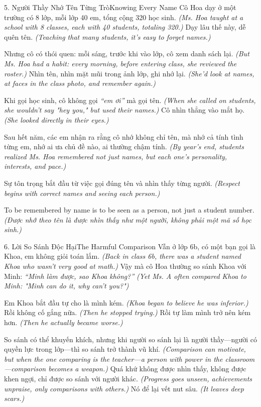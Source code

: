 \begin{truyen}{5. Người Thầy Nhớ Tên Từng Trò}{Knowing Every Name}
Cô Hoa dạy ở một trường có 8 lớp, mỗi lớp 40 em, tổng cộng 320 học sinh.
\textit{(Ms. Hoa taught at a school with 8 classes, each with 40 students, totaling 320.)}
Dạy lâu thế này, dễ quên tên.
\textit{(Teaching that many students, it's easy to forget names.)}

Nhưng cô có thói quen: mỗi sáng, trước khi vào lớp, cô xem danh sách lại.
\textit{(But Ms. Hoa had a habit: every morning, before entering class, she reviewed the roster.)}
Nhìn tên, nhìn mặt mũi trong ảnh lớp, ghi nhớ lại.
\textit{(She'd look at names, at faces in the class photo, and remember again.)}

Khi gọi học sinh, cô không gọi \textit{``em ơi''} mà gọi tên.
\textit{(When she called on students, she wouldn't say "hey you," but used their names.)}
Cô nhìn thẳng vào mắt họ.
\textit{(She looked directly in their eyes.)}

Sau hết năm, các em nhận ra rằng cô nhớ không chỉ tên, mà nhớ cả tính tình từng em, nhớ ai ưa chủ đề nào, ai thường chậm tính.
\textit{(By year's end, students realized Ms. Hoa remembered not just names, but each one's personality, interests, and pace.)}

Sự tôn trọng bắt đầu từ việc gọi đúng tên và nhìn thấy từng người.
\textit{(Respect begins with correct names and seeing each person.)}
\end{truyen}

\begin{ghinhoanh}
To be remembered by name is to be seen as a person, not just a student number.
\textit{(Được nhớ theo tên là được nhìn thấy như một người, không phải một mã số học sinh.)}
\end{ghinhoanh}

\begin{truyen}{6. Lời So Sánh Độc Hại}{The Harmful Comparison}
Vẫn ở lớp 6b, có một bạn gọi là Khoa, em không giỏi toán lắm.
\textit{(Back in class 6b, there was a student named Khoa who wasn't very good at math.)}
Vậy mà cô Hoa thường so sánh Khoa với Minh: \textit{``Minh làm được, sao Khoa không?''}
\textit{(Yet Ms. A often compared Khoa to Minh: "Minh can do it, why can't you?")}

Em Khoa bắt đầu tự cho là mình kém.
\textit{(Khoa began to believe he was inferior.)}
Rồi không cố gắng nữa.
\textit{(Then he stopped trying.)}
Rồi tự làm mình trở nên kém hơn.
\textit{(Then he actually became worse.)}

So sánh có thể khuyến khích, nhưng khi người so sánh lại là người thầy—người có quyền lực trong lớp—thì so sánh trở thành vũ khí.
\textit{(Comparison can motivate, but when the one comparing is the teacher—a person with power in the classroom—comparison becomes a weapon.)}
Quá khứ không được nhìn thấy, không được khen ngợi, chỉ được so sánh với người khác.
\textit{(Progress goes unseen, achievements unpraise, only comparisons with others.)}
Nó để lại vết nut sâu.
\textit{(It leaves deep scars.)}
\end{truyen}

